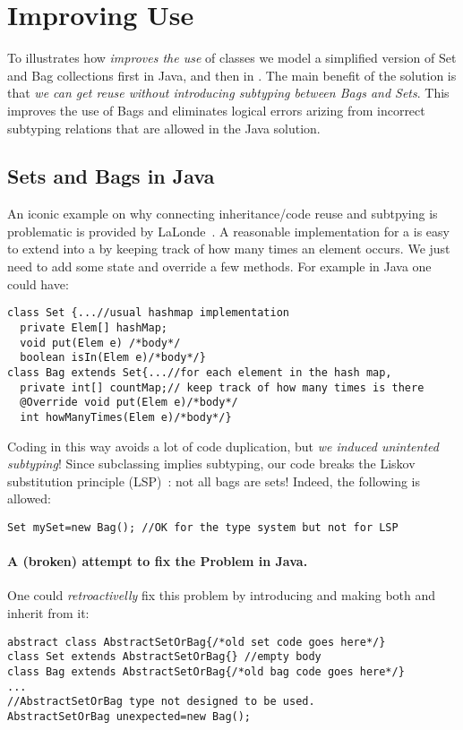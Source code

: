 \section{Improving Use}

To illustrates how 
\name \emph{improves the use} of classes we model a simplified version of
Set and Bag collections first in Java, and then in \name.
The main benefit of the \name solution is that \emph{we can get reuse 
without introducing subtyping between Bags and Sets}. This improves the 
use of Bags and eliminates logical errors arizing from incorrect
subtyping relations that are allowed in the Java solution. 

\subsection{Sets and Bags in Java}
An iconic example on why connecting inheritance/code reuse and
subtpying is problematic is provided by
LaLonde~\cite{LaLonde:1991:SSS:110673.110679}.  A reasonable
implementation for a \Q@Set@ is easy to extend into a \Q@Bag@ by
keeping track of how many times an element occurs.  We just need to
add some state and override a few methods.
For example in Java one could have:

\begin{lstlisting}
class Set {...//usual hashmap implementation
  private Elem[] hashMap;
  void put(Elem e) /*body*/
  boolean isIn(Elem e)/*body*/}
class Bag extends Set{...//for each element in the hash map,
  private int[] countMap;// keep track of how many times is there
  @Override void put(Elem e)/*body*/
  int howManyTimes(Elem e)/*body*/}
\end{lstlisting}

\noindent Coding \Q@Bag@ in this way avoids a lot of code
duplication, but \emph{we induced unintented subtyping}! 
Since subclassing implies subtyping, our code breaks the Liskov substitution principle (LSP)~\cite{martin2000design}: not all bags are sets!
Indeed, the following is allowed:

\begin{lstlisting}
Set mySet=new Bag(); //OK for the type system but not for LSP
\end{lstlisting}


\paragraph{A (broken) attempt to fix the Problem in Java.}
One could \emph{retroactivelly} fix this problem by introducing \Q@AbstractSetOrBag@
and making both \Q@Bag@ and \Q@Set@ inherit from it:
\begin{lstlisting}
abstract class AbstractSetOrBag{/*old set code goes here*/}
class Set extends AbstractSetOrBag{} //empty body
class Bag extends AbstractSetOrBag{/*old bag code goes here*/}
...
//AbstractSetOrBag type not designed to be used.
AbstractSetOrBag unexpected=new Bag(); 
\end{lstlisting}

